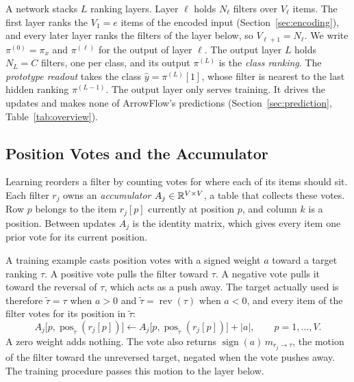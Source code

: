 A network stacks $L$ ranking layers. Layer $\ell$ holds $N_\ell$ filters over $V_\ell$ items. The first layer ranks the $V_1=e$ items of the encoded input (Section~\ref{sec:encoding}), and every later layer ranks the filters of the layer below, so $V_{\ell+1}=N_\ell$. We write $\pi^{(0)}=\pi_x$ and $\pi^{(\ell)}$ for the output of layer $\ell$. The output layer $L$ holds $N_L=C$ filters, one per class, and its output $\pi^{(L)}$ is the \emph{class ranking}. The \emph{prototype readout} takes the class $\hat y=\pi^{(L)}[1]$, whose filter is nearest to the last hidden ranking $\pi^{(L-1)}$. The output layer only serves training. It drives the updates and makes none of ArrowFlow's predictions (Section~\ref{sec:prediction}, Table~\ref{tab:overview}).



\subsection{Position Votes and the Accumulator}\label{sec:accumulation}

Learning reorders a filter by counting votes for where each of its items should sit. Each filter $r_j$ owns an \emph{accumulator} $A_j\in\mathbb{R}^{V\times V}$, a table that collects these votes. Row $p$ belongs to the item $r_j[p]$ currently at position $p$, and column $k$ is a position. Between updates $A_j$ is the identity matrix, which gives every item one prior vote for its current position.



A training example casts position votes with a signed weight $a$ toward a target ranking $\tau$. A positive vote pulls the filter toward $\tau$. A negative vote pulls it toward the reversal of $\tau$, which acts as a push away. The target actually used is therefore $\tilde\tau=\tau$ when $a>0$ and $\tilde\tau=\operatorname{rev}(\tau)$ when $a<0$, and every item of the filter votes for its position in $\tilde\tau$:
\begin{equation}
A_j\bigl[p,\operatorname{pos}_{\tilde\tau}(r_j[p])\bigr]\leftarrow A_j\bigl[p,\operatorname{pos}_{\tilde\tau}(r_j[p])\bigr]+|a|,\qquad p=1,\dots,V.
\label{eq:vote}
\end{equation}
A zero weight adds nothing. The vote also returns $\operatorname{sign}(a)\,m_{r_j\to\tau}$, the motion of the filter toward the unreversed target, negated when the vote pushes away. The training procedure passes this motion to the layer below.

